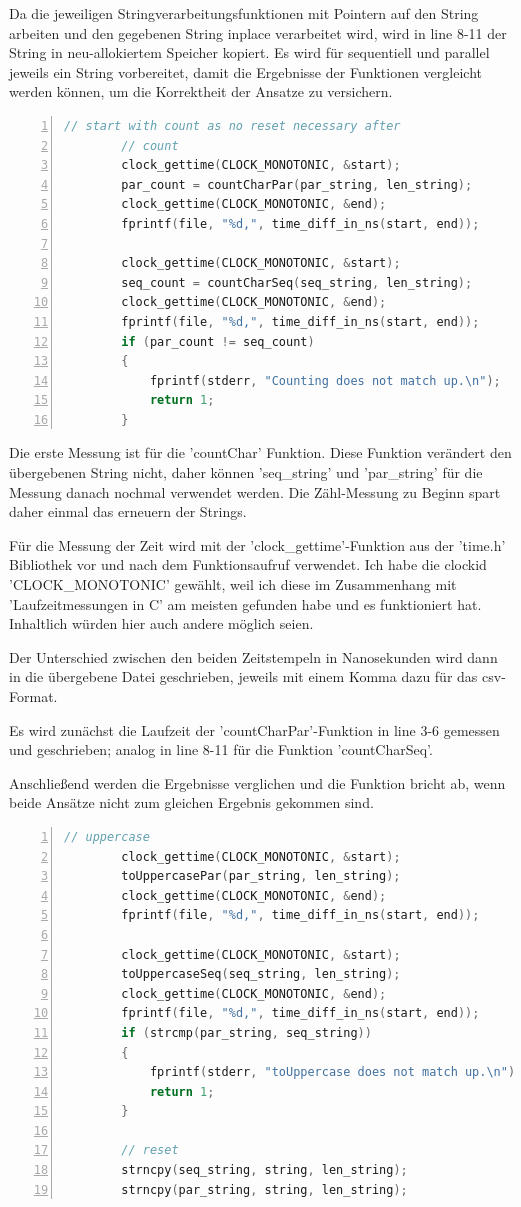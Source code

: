 \documentclass[plainarticle,zihtitle,german,final,hyperref,utf8]{zihpub}
\begin{document}
Da die jeweiligen Stringverarbeitungsfunktionen mit Pointern auf den String arbeiten und den gegebenen String inplace verarbeitet wird, wird in line 8-11 der String in neu-allokiertem Speicher kopiert.
Es wird für se­quen­ti­ell und parallel jeweils ein String vorbereitet, damit die Ergebnisse der Funktionen vergleicht werden können, um die Korrektheit der Ansatze zu versichern.

\begin{lstlisting}[language=c, numbers=left]		
		// start with count as no reset necessary after
		// count
		clock_gettime(CLOCK_MONOTONIC, &start);	
		par_count = countCharPar(par_string, len_string);
		clock_gettime(CLOCK_MONOTONIC, &end);
		fprintf(file, "%d,", time_diff_in_ns(start, end));	
		
		clock_gettime(CLOCK_MONOTONIC, &start);	
		seq_count = countCharSeq(seq_string, len_string);
		clock_gettime(CLOCK_MONOTONIC, &end);
		fprintf(file, "%d,", time_diff_in_ns(start, end));	
		if (par_count != seq_count)
		{
			fprintf(stderr, "Counting does not match up.\n");
			return 1;
		}
\end{lstlisting}

Die erste Messung ist für die 'countChar' Funktion. Diese Funktion verändert den übergebenen String nicht, daher können 'seq\_string' und 'par\_string' für die Messung danach nochmal verwendet werden. Die Zähl-Messung zu Beginn spart daher einmal das erneuern der Strings.

Für die Messung der Zeit wird mit der 'clock\_gettime'-Funktion aus der 'time.h' Bibliothek vor und nach dem Funktionsaufruf verwendet. Ich habe die clockid 'CLOCK\_MONOTONIC' gewählt, weil ich diese im Zusammenhang mit 'Laufzeitmessungen in C' am meisten gefunden habe und es funktioniert hat. Inhaltlich würden hier auch andere möglich seien.

Der Unterschied zwischen den beiden Zeitstempeln in Nanosekunden wird dann in die übergebene Datei geschrieben, jeweils mit einem Komma dazu für das csv-Format.

Es wird zunächst die Laufzeit der 'countCharPar'-Funktion in line 3-6 gemessen und geschrieben; analog in line 8-11 für die Funktion 'countCharSeq'.

Anschließend werden die Ergebnisse verglichen und die Funktion bricht ab, wenn beide Ansätze nicht zum gleichen Ergebnis gekommen sind.
		
\begin{lstlisting}[language=c, numbers=left]		
		// uppercase
		clock_gettime(CLOCK_MONOTONIC, &start);	
		toUppercasePar(par_string, len_string);
		clock_gettime(CLOCK_MONOTONIC, &end);
		fprintf(file, "%d,", time_diff_in_ns(start, end));	
		
		clock_gettime(CLOCK_MONOTONIC, &start);	
		toUppercaseSeq(seq_string, len_string);
		clock_gettime(CLOCK_MONOTONIC, &end);
		fprintf(file, "%d,", time_diff_in_ns(start, end));	
		if (strcmp(par_string, seq_string))
		{
			fprintf(stderr, "toUppercase does not match up.\n");
			return 1;
		}
		
		// reset
		strncpy(seq_string, string, len_string);
		strncpy(par_string, string, len_string);
\end{lstlisting}		
\end{document}
